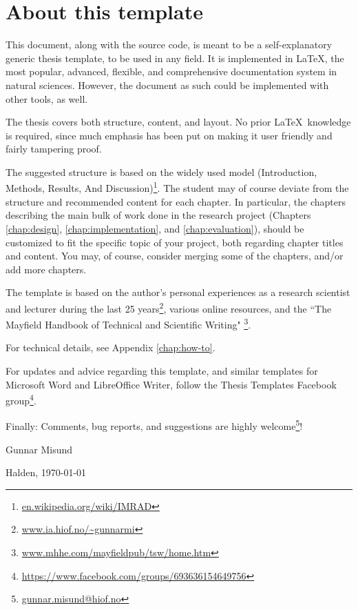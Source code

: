 \chapter*{About this template}
\label{chap:about}


This document, along with the source code, is meant to be a self-explanatory generic thesis template, to be used in any field. It is implemented in \LaTeX, the most popular, advanced, flexible, and comprehensive documentation system in natural sciences. However, the document as such could be implemented with other tools, as well.

The thesis covers both structure, content, and layout. No prior \LaTeX\ knowledge is required, since much emphasis has been put on making it user friendly and fairly tampering proof.

The suggested structure is based on the widely used  model (Introduction, Methods, Results, And Discussion)\footnote{\url{en.wikipedia.org/wiki/IMRAD}}. The student may of course deviate from the structure and recommended content for each chapter. In particular, the chapters describing the main bulk of work done in the research project (Chapters \ref{chap:design}, \ref{chap:implementation}, and \ref{chap:evaluation}), should be customized to fit the specific topic of your project, both regarding chapter titles and content. You may, of course, consider merging some of the chapters, and/or add more chapters.

The template is based on the author's personal experiences as a research scientist and lecturer during the last 25 years\footnote{\url{www.ia.hiof.no/~gunnarmi}}, various online resources, 
and the ``The Mayfield Handbook of Technical and Scientific Writing"  \cite{perelman97mht}\footnote{\url{www.mhhe.com/mayfieldpub/tsw/home.htm}}.

For technical details, see Appendix \ref{chap:how-to}.

For updates and advice regarding this template, and similar templates for Microsoft Word and LibreOffice Writer, follow the Thesis Templates Facebook group\footnote{\url{https://www.facebook.com/groups/693636154649756}}.

Finally: Comments, bug reports, and suggestions are highly welcome\footnote{\url{gunnar.misund@hiof.no}}!

\vspace{20mm}

Gunnar Misund

Halden, \today





